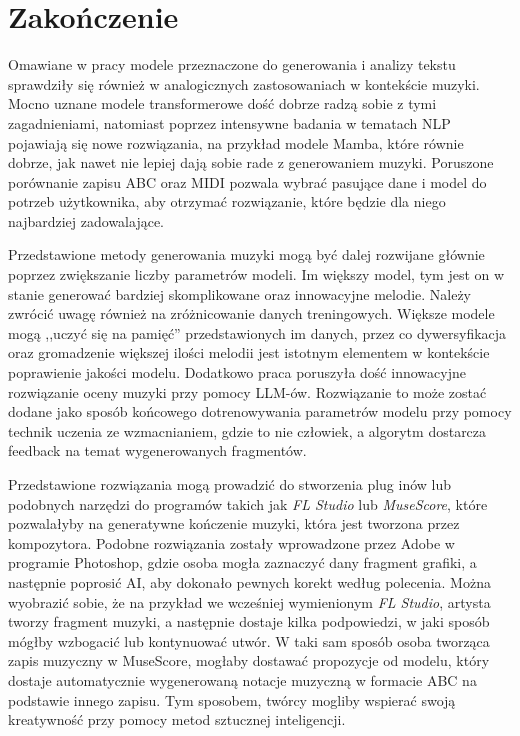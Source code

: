 \documentclass[data-science]{agh-wi} %
\begin{document}
\chapter{Zakończenie}

Omawiane w pracy modele przeznaczone do generowania i analizy tekstu sprawdziły się również w analogicznych zastosowaniach w kontekście muzyki. Mocno uznane modele transformerowe dość dobrze radzą sobie z tymi zagadnieniami, natomiast poprzez intensywne badania w tematach NLP pojawiają się nowe rozwiązania, na przykład modele Mamba, które równie dobrze, jak nawet nie lepiej dają sobie rade z generowaniem muzyki. Poruszone porównanie zapisu ABC oraz MIDI pozwala wybrać pasujące dane i model do potrzeb użytkownika, aby otrzymać rozwiązanie, które będzie dla niego najbardziej zadowalające.

Przedstawione metody generowania muzyki mogą być dalej rozwijane głównie poprzez zwiększanie liczby parametrów modeli. Im większy model, tym jest on w stanie generować bardziej skomplikowane oraz innowacyjne melodie. Należy zwrócić uwagę również na zróżnicowanie danych treningowych. Większe modele mogą ,,uczyć się na pamięć'' przedstawionych im danych, przez co dywersyfikacja oraz gromadzenie większej ilości melodii jest istotnym elementem w kontekście poprawienie jakości modelu. Dodatkowo praca poruszyła dość innowacyjne rozwiązanie oceny muzyki przy pomocy LLM-ów. Rozwiązanie to może zostać dodane jako sposób końcowego dotrenowywania parametrów modelu przy pomocy technik uczenia ze wzmacnianiem, gdzie to nie człowiek, a algorytm dostarcza feedback na temat wygenerowanych fragmentów.

Przedstawione rozwiązania mogą prowadzić do stworzenia plug inów lub podobnych narzędzi do programów takich jak \textit{FL Studio} lub \textit{MuseScore}, które pozwalałyby na generatywne kończenie muzyki, która jest tworzona przez kompozytora. Podobne rozwiązania zostały wprowadzone przez Adobe w programie Photoshop, gdzie osoba mogła zaznaczyć dany fragment grafiki, a następnie poprosić AI, aby dokonało pewnych korekt według polecenia. Można wyobrazić sobie, że na przykład we wcześniej wymienionym \textit{FL Studio}, artysta tworzy fragment muzyki, a następnie dostaje kilka podpowiedzi, w jaki sposób mógłby wzbogacić lub kontynuować utwór. W taki sam sposób osoba tworząca zapis muzyczny w MuseScore, mogłaby dostawać propozycje od modelu, który dostaje automatycznie wygenerowaną notacje muzyczną w formacie ABC na podstawie innego zapisu. Tym sposobem, twórcy mogliby wspierać swoją kreatywność przy pomocy metod sztucznej inteligencji.
\end{document}
